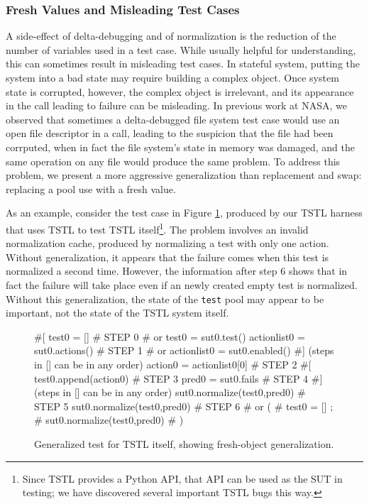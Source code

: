 \subsubsection{Fresh Values and Misleading Test Cases}

A side-effect of delta-debugging and of normalization is the reduction
of the number of variables used in a test case.  While usually helpful
for understanding, this can sometimes result in misleading test
cases.  In stateful system, putting the system into a bad state may require
building a complex object.  Once system state is corrupted, however,
the complex object is irrelevant, and its appearance in the call
leading to failure can be misleading.  In previous work at NASA, we
observed that sometimes a delta-debugged file system test case
\cite{ICSEDiff,AMAI} would use an open file descriptor in a call,
leading to the suspicion that the file had been corrputed, when in
fact the file system's state in memory was damaged, and the same
operation on any file would produce the same problem.  To address this
problem, we present a more aggressive generalization than
replacement and swap:  replacing a pool use with a
fresh value.  

As an example, consider the test case in Figure \ref{fig:mislead},
produced by our TSTL harness that uses TSTL to test TSTL
itself\footnote{Since TSTL provides a Python API, that API can be used
  as the SUT in testing; we have discovered several important TSTL
  bugs this way.}.  The problem involves an invalid normalization
cache, produced by normalizing a test with only one action.  Without
generalization, it appears that the failure comes when this test is
normalized a second time.  However, the information after step 6 shows
that in fact the failure will take place even if an newly created empty test is
normalized.  Without this generalization, the state of the {\tt test} pool
may appear to be important, not the state of the TSTL system itself.

\begin{figure}
{\scriptsize
\begin{code}
\textcolor{black!45}{\#[}
test0 = []                             \textcolor{black!45}{\# STEP 0}
\textcolor{black!45}{\#  or test0 = sut0.test() }
actionlist0 = sut0.actions()           \textcolor{black!45}{\# STEP 1}
\textcolor{black!45}{\#  or actionlist0 = sut0.enabled() }
\textcolor{black!45}{\#] (steps in [] can be in any order)}
action0 = actionlist0[0]               \textcolor{black!45}{\# STEP 2}
\textcolor{black!45}{\#[}
test0.append(action0)                  \textcolor{black!45}{\# STEP 3}
pred0 = sut0.fails                     \textcolor{black!45}{\# STEP 4}
\textcolor{black!45}{\#] (steps in [] can be in any order)}
sut0.normalize(test0,pred0)            \textcolor{black!45}{\# STEP 5}
sut0.normalize(test0,pred0)            \textcolor{black!45}{\# STEP 6}
\textcolor{black!45}{\#  or (}
\textcolor{black!45}{\#      test0 = []  ;}
\textcolor{black!45}{\#      sut0.normalize(test0,pred0) }
\textcolor{black!45}{\#     )}
\end{code}
}
\caption{Generalized test for TSTL itself, showing fresh-object
  generalization.}
\label{fig:mislead}
\end{figure}


